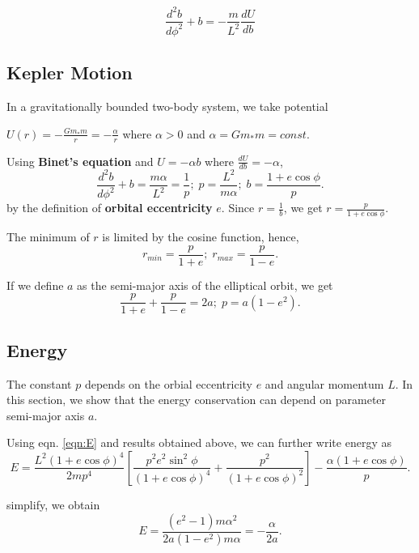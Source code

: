 \documentclass{article}
\begin{document}
 \begin{equation}
    \frac{d^2 b}{d\phi^2} + b = - \frac{m}{L^2}\frac{dU}{db}
\end{equation}

\subsection{Kepler Motion}

In a gravitationally bounded two-body system, we take potential 

$U(r) = -\frac{Gm_\ast m}{r} = - \frac{\alpha}{r}$ where $\alpha > 0$ and $\alpha = Gm_\ast m = const$.

Using \textbf{Binet's equation} and $U = -\alpha b$ where $\frac{dU}{db} = -\alpha$,
\begin{equation}
    \frac{d^2 b}{d\phi^2} +b = \frac{m\alpha}{L^2} = \frac{1}{p}; \; p = \frac{L^2}{m\alpha}; \; b = \frac{1+e \cos{\phi}}{p}.
\end{equation}
by the definition of \textbf{orbital eccentricity} $e$.
Since $r = \frac{1}{b}$, we get $r = \frac{p}{1 + e\cos{\phi}}$.

The minimum of $r$ is limited by the cosine function, hence,
\begin{equation}
    r_{\textit{min}} = \frac{p}{1+e}; \; r_{\textit{max}} = \frac{p}{1-e}.
\end{equation}

If we define $a$ as the semi-major axis of the elliptical orbit, we get
\begin{equation}
    \frac{p}{1+e} + \frac{p}{1-e} = 2a; \; p = a(1-e^2).
\end{equation}

\subsection{Energy}
The constant $p$ depends on the orbial eccentricity $e$ and angular momentum $L$. In this section, we show that the energy conservation
can depend on parameter semi-major axis $a$.

Using eqn. \ref{eqn:E} and results obtained above, we can further write energy as 
\begin{equation}
    E = \frac{L^2 (1+e \cos{\phi})^4}{2mp^4} \left[\frac{p^2 e^2 \sin^2{\phi}}{(1+e\cos{\phi})^4}
    + \frac{p^2}{(1+e\cos{\phi})^2}\right] - \frac{\alpha (1+e\cos{\phi})}{p}.
\end{equation}

simplify, we obtain 
\begin{equation}
    E = \frac{(e^2 -1)m\alpha^2}{2a (1-e^2)m\alpha} = -\frac{\alpha}{2a}.
\end{equation}
\end{document}
